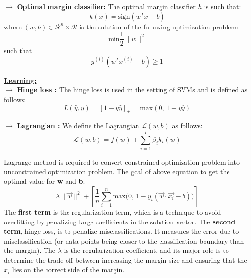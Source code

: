 \documentclass[letterpaper, 10.5pt,landscape]{article}
\begin{document}
\begin{multicols*}{3}

\vspace{3pt}
$\rightarrow$ \textbf{Optimal margin classifier: } The optimal margin classifier $h$ is such that: 
\vspace{-4pt}
\[\boxed{h(x) = \text{sign}(w^{T}x - b)} \]
where $(w, b) \in \mathcal{R}^{n} \times \mathcal{R}$ is the  solution of the following optimization problem:
\vspace{-4pt}
\[ \boxed{\text{min}\frac{1}{2} \lVert {w} \rVert^{2} }\] such that \hspace{5pt} \[\boxed{y^{(i)} (w^{T}x^{(i)} - b) \geq 1}\]

\vspace{3pt}


\textbf{\underline{Learning:}} \\
$\rightarrow$ \textbf{Hinge loss : } The hinge loss is used in the setting of SVMs and is defined as follows:
\vspace{-2pt}
\[\boxed{L(\hat{y},y) = \left[1 - y\hat{y}  \right]_{+} = \text{max}(0, \, 1-y\hat{y})} \]

\vspace{3pt}
$\rightarrow$ \textbf{Lagrangian : } We define the Lagrangian $\mathcal{L}(w, b)$ as follows:
\vspace{-3pt}
\[\boxed{\mathcal{L}(w, b) = f(w) + \sum^{l}_{i=1} \beta_{i} h_{i} (w) }\]


Lagrange method is required to convert constrained optimization problem into unconstrained optimization problem. The goal of above equation to get the optimal value for \textbf{w} and \textbf{b}.
\vspace{-4pt}
\[\boxed{ \lambda \lVert \vec{w} \rVert^{2} + \left[ \frac{1}{n} \sum^{n}_{i=1} \text{max} \big(0, \, 1 - y_{i}(\vec{w} \cdot \vec{x_{i}} - b) \big)\right] }  \] 
The\textbf{ first term} is the regularization term, which is a technique to avoid overfitting by penalizing large coefficients in the solution vector. The \textbf{second term}, hinge loss, is to penalize misclassifications. It measures the error due to misclassification (or data points being closer to the classification boundary than the margin).  The $\lambda$ is the regularization coefficient, and its major role is to determine the trade-off between increasing the margin size and ensuring that the $x_{i}$ lies on the correct side of the margin.





\end{multicols*}
\end{document}
